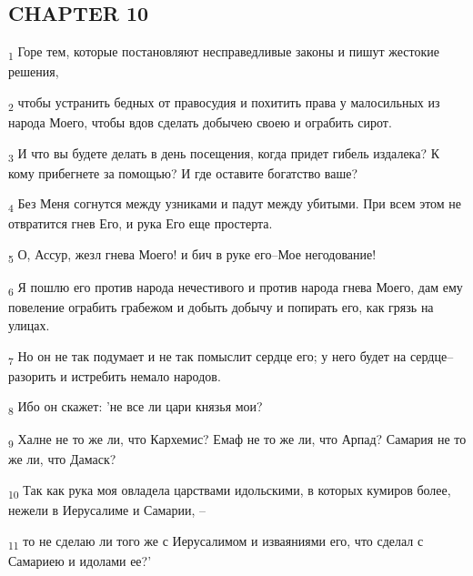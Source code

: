 \subsection{CHAPTER 10}
\begin{tcolorbox}
\textsubscript{1} Горе тем, которые постановляют несправедливые законы и пишут жестокие решения,
\end{tcolorbox}
\begin{tcolorbox}
\textsubscript{2} чтобы устранить бедных от правосудия и похитить права у малосильных из народа Моего, чтобы вдов сделать добычею своею и ограбить сирот.
\end{tcolorbox}
\begin{tcolorbox}
\textsubscript{3} И что вы будете делать в день посещения, когда придет гибель издалека? К кому прибегнете за помощью? И где оставите богатство ваше?
\end{tcolorbox}
\begin{tcolorbox}
\textsubscript{4} Без Меня согнутся между узниками и падут между убитыми. При всем этом не отвратится гнев Его, и рука Его еще простерта.
\end{tcolorbox}
\begin{tcolorbox}
\textsubscript{5} О, Ассур, жезл гнева Моего! и бич в руке его--Мое негодование!
\end{tcolorbox}
\begin{tcolorbox}
\textsubscript{6} Я пошлю его против народа нечестивого и против народа гнева Моего, дам ему повеление ограбить грабежом и добыть добычу и попирать его, как грязь на улицах.
\end{tcolorbox}
\begin{tcolorbox}
\textsubscript{7} Но он не так подумает и не так помыслит сердце его; у него будет на сердце--разорить и истребить немало народов.
\end{tcolorbox}
\begin{tcolorbox}
\textsubscript{8} Ибо он скажет: 'не все ли цари князья мои?
\end{tcolorbox}
\begin{tcolorbox}
\textsubscript{9} Халне не то же ли, что Кархемис? Емаф не то же ли, что Арпад? Самария не то же ли, что Дамаск?
\end{tcolorbox}
\begin{tcolorbox}
\textsubscript{10} Так как рука моя овладела царствами идольскими, в которых кумиров более, нежели в Иерусалиме и Самарии, --
\end{tcolorbox}
\begin{tcolorbox}
\textsubscript{11} то не сделаю ли того же с Иерусалимом и изваяниями его, что сделал с Самариею и идолами ее?'
\end{tcolorbox}
